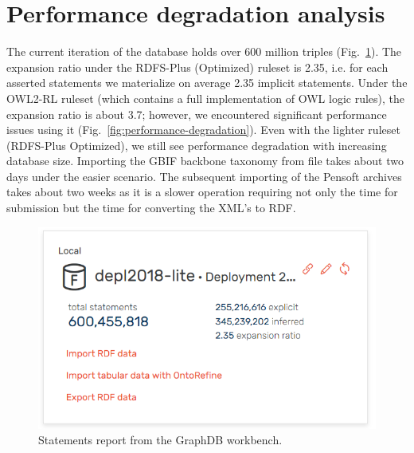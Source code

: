 \section{Performance degradation analysis}

The current iteration of the database holds over 600 million triples (Fig.~\ref{fig:statements-report}). The expansion ratio under the RDFS-Plus (Optimized) ruleset is 2.35, i.e. for each asserted statements we materialize on average 2.35 implicit statements. Under the OWL2-RL ruleset (which contains a full implementation of OWL logic rules), the expansion ratio is about 3.7; however, we encountered significant performance issues using it (Fig.~\ref{fig:performance-degradation}). Even with the lighter ruleset (RDFS-Plus Optimized), we still see performance degradation with increasing database size. Importing the GBIF backbone taxonomy from file takes about two days under the easier scenario. The subsequent importing of the Pensoft archives takes about two weeks as it is a slower operation requiring not only the time for submission but the time for converting the XML's to RDF.

\begin{figure}
\centering
\includegraphics[width=\textwidth]{Figures/active-repository}
\decoRule
\caption[Statements report]{Statements report from the GraphDB workbench.}
\label{fig:statements-report}
\end{figure}

